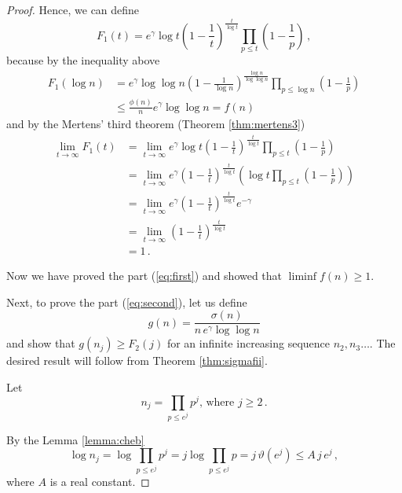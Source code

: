 \documentclass{article}
\begin{document}
\begin{theorem}
\begin{proof}
Hence, we can define
\begin{equation*}
    F_1(t)=e^\gamma \log t \left(1-\frac{1}{t}\right)^\frac{t}{\log t} \prod_{p\leq t} \left(1-\frac{1}{p}\right)\,,
\end{equation*}
because by the inequality above
\begin{align*}
    F_1(\log n) & = e^\gamma \log \log n \left(1-\frac{1}{\log n}\right)^\frac{\log n}{\log \log n} \prod_{p\leq \log n} \left(1-\frac{1}{p}\right)\\
    & \leq \frac{\phi(n)}{n} e^\gamma \log\log n = f(n)
\end{align*}
and by the Mertens' third theorem (Theorem \ref{thm:mertens3})
\begin{align*}
    \lim_{t \rightarrow \infty} F_1(t) & = \lim_{t \rightarrow \infty} e^\gamma \log t \left(1-\frac{1}{t}\right)^\frac{t}{\log t} \prod_{p\leq t} \left(1-\frac{1}{p}\right)\\
    & = \lim_{t \rightarrow \infty} e^\gamma \left( 1-\frac{1}{t}\right)^\frac{t}{\log t} \left(\log t \prod_{p\leq t} \left(1-\frac{1}{p}\right) \right)\\
    & = \lim_{t \rightarrow \infty} e^\gamma \left( 1-\frac{1}{t}\right)^\frac{t}{\log t} e^{-\gamma}\\
    & = \lim_{t \rightarrow \infty} \left( 1-\frac{1}{t}\right)^\frac{t}{\log t}\\
    & = 1\,.
\end{align*}

Now we have proved the part (\ref{eq:first}) and showed that
$\liminf{f(n)}\geq 1$.

Next, to prove the part (\ref{eq:second}), let us define
\begin{equation*}
    g(n)=\frac{\sigma(n)}{n\,e^\gamma \log\log n}
\end{equation*}
and show that $g(n_j) \geq F_2(j)$ for an infinite increasing sequence $n_2,n_3\dots$. The desired result will follow from Theorem \ref{thm:sigmafii}.

Let
\begin{equation*}
    n_j=\prod_{p\leq e^j} p^j\text{, where } j\geq 2\,.
\end{equation*}

By the Lemma \ref{lemma:cheb}
\begin{equation*}
    \log n_j = \log \prod_{p\leq e^j} p^j = j \log \prod_{p\leq e^j} p = j\,\vartheta(e^j) \leq A\,j\,e^j\,,
\end{equation*}
where $A$ is a real constant.


\end{proof}
\end{theorem}
\end{document}
